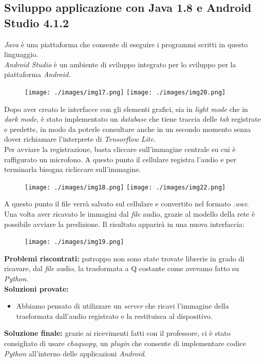 \subsection{Sviluppo applicazione con Java 1.8 e Android Studio 4.1.2}
\textit{Java} è una piattaforma che consente di eseguire i programmi scritti in questo linguaggio.\\
\newline
\textit{Android Studio} è un ambiente di sviluppo integrato per lo sviluppo per la piattaforma \textit{Android}.\\
\newline
\begin{figure}[H]
	\centering
	\texttt{[image: ./images/img17.png]}
	\texttt{[image: ./images/img20.png]}
\end{figure}
\noindent Dopo aver creato le interfacce con gli elementi grafici, sia in \textit{light mode} che in \textit{dark mode}, è stato implementato un \textit{database} che tiene traccia delle \textit{tab} registrate e predette, in modo da poterle consultare anche in un secondo momento senza dover richiamare l'interprete di \textit{Tensorflow Lite}.\\
\newline
Per avviare la registrazione, basta cliccare sull'immagine centrale su cui è raffigurato un microfono. A questo punto il cellulare registra l'audio e per terminarla bisogna ricliccare sull'immagine.
\begin{figure}[H]
	\centering
	\texttt{[image: ./images/img18.png]}
	\texttt{[image: ./images/img22.png]}
\end{figure}
\noindent A questo punto il file verrà salvato sul cellulare e convertito nel formato .\textit{wav}. Una volta aver ricavato le immagini dal \textit{file} audio, grazie al modello della rete è possibile avviare la predizione. Il risultato apparirà in una nuova interfaccia:
\begin{figure}[H]
	\centering
	\texttt{[image: ./images/img19.png]}
\end{figure}
\noindent \textbf{Problemi riscontrati:} putroppo non sono state trovate librerie in grado di ricavare, dal \textit{file} audio, la trasformata a Q costante come avevamo fatto su \textit{Python}.\\
\newline
%
\textbf{Soluzioni provate:}
\begin{itemize}
	\item Abbiamo pensato di utilizzare un \textit{server} che ricavi l'immagine della trasformata dall'audio registrato e la restituisca al dispositivo.\\
\end{itemize}
%
\textbf{Soluzione finale:} grazie ai ricevimenti fatti con il professore, ci è stato consigliato di usare \textit{chaquopy}, un \textit{plugin} che consente di implementare codice \textit{Python} all'interno delle applicazioni \textit{Android}.
